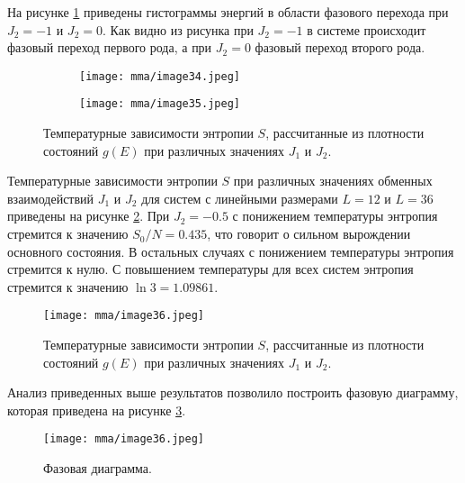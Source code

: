 На рисунке \ref{mma-fig-9} приведены гистограммы энергий в области фазового перехода при $J_2 = -1$ и $J_2 = 0$. Как видно из рисунка при $J_2 = -1$ в системе происходит фазовый переход первого рода, а при $J_2 = 0$ фазовый переход второго рода.
\begin{figure}[h]
    \begin{center}
        \begin{subfigure}{0.45\textwidth}
            \begin{center}
                \texttt{[image: mma/image34.jpeg]}
            \end{center}
        \end{subfigure}
        \begin{subfigure}{0.45\textwidth}
            \begin{center}
                \texttt{[image: mma/image35.jpeg]}
            \end{center}
        \end{subfigure}
    \end{center}
    \caption{Температурные зависимости энтропии $S$, рассчитанные из плотности состояний $g(E)$ при различных значениях $J_1$ и $J_2$.}
    \label{mma-fig-9}
\end{figure}

Температурные зависимости энтропии $S$ при различных значениях обменных взаимодействий $J_1$ и $J_2$ для систем с линейными размерами $L=12$ и $L=36$ приведены на рисунке \ref{mma-fig-10}. При $J_2 = -0.5$ с понижением температуры энтропия стремится к значению $S_0/N = 0.435$, что говорит о сильном вырождении основного состояния. В остальных случаях с понижением температуры энтропия стремится к нулю. С повышением температуры для всех систем энтропия стремится к значению $\ln3 = 1.09861$.
\begin{figure}[h]
    \begin{center}
        \texttt{[image: mma/image36.jpeg]}
    \end{center}
    \caption{Температурные зависимости энтропии $S$, рассчитанные из плотности состояний $g(E)$ при различных значениях $J_1$ и $J_2$.}
    \label{mma-fig-10}
\end{figure}

Анализ приведенных выше результатов позволило построить фазовую диаграмму, которая приведена на рисунке \ref{mma-fig-11}.
\begin{figure}[h]
    \begin{center}
        \texttt{[image: mma/image36.jpeg]}
    \end{center}
    \caption{Фазовая диаграмма.}
    \label{mma-fig-11}
\end{figure}


